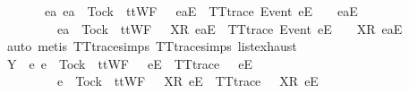 \begin{isabellebody}
\ \ \ \ \ \ {\isasymsubseteq}\ {\isacharbraceleft}ea{\isachardot}\ ea\ {\isasymnoteq}\ Tock\ {\isasymand}\ ttWF\ {\isacharparenleft}{\isasymsigma}{\isacharprime}\ {\isacharat}\ {\isacharbrackleft}{\isacharbrackleft}ea{\isacharbrackright}\isactrlsub E{\isacharbrackright}{\isacharparenright}\ {\isasymand}\ TT{}{\isacharunderscore}trace\ {\isacharparenleft}{\isacharbrackleft}Event\ e{\isacharbrackright}\isactrlsub E\ {\isacharhash}\ {\isasymsigma}{\isacharprime}\ {\isacharat}\ {\isacharbrackleft}{\isacharbrackleft}ea{\isacharbrackright}\isactrlsub E{\isacharbrackright}{\isacharparenright}\isanewline
\ \ \ \ \ \ \ \ {\isasymor}\ ea\ {\isacharequal}\ Tock\ {\isasymand}\ ttWF\ {\isacharparenleft}{\isasymsigma}{\isacharprime}\ {\isacharat}\ {\isacharbrackleft}{\isacharbrackleft}X{\isacharbrackright}\isactrlsub R{\isacharcomma}\ {\isacharbrackleft}ea{\isacharbrackright}\isactrlsub E{\isacharbrackright}{\isacharparenright}\ {\isasymand}\ TT{}{\isacharunderscore}trace\ {\isacharparenleft}{\isacharbrackleft}Event\ e{\isacharbrackright}\isactrlsub E\ {\isacharhash}\ {\isasymsigma}{\isacharprime}\ {\isacharat}\ {\isacharbrackleft}{\isacharbrackleft}X{\isacharbrackright}\isactrlsub R{\isacharcomma}\ {\isacharbrackleft}ea{\isacharbrackright}\isactrlsub E{\isacharbrackright}{\isacharparenright}{\isacharbraceright}{\isachardoublequoteclose}\isanewline
\ \ \ \ \ \ \isamarkupfalse%
\ {\isacharparenleft}auto{\isacharcomma}\ {\isacharparenleft}metis\ TT{}{\isacharunderscore}trace{\isachardot}simps{\isacharparenleft}{}{\isacharparenright}\ TT{}{\isacharunderscore}trace{\isachardot}simps{\isacharparenleft}{}{\isacharparenright}\ list{\isachardot}exhaust{\isacharparenright}{\isacharplus}{\isacharparenright}\isanewline
\ \ \ \ \isamarkupfalse%
\ \isamarkupfalse%
\ {\isachardoublequoteopen}Y\ {\isasyminter}\ {\isacharbraceleft}e{\isachardot}\ e\ {\isasymnoteq}\ Tock\ {\isasymand}\ ttWF\ {\isacharparenleft}{\isasymsigma}{\isacharprime}\ {\isacharat}\ {\isacharbrackleft}{\isacharbrackleft}e{\isacharbrackright}\isactrlsub E{\isacharbrackright}{\isacharparenright}\ {\isasymand}\ TT{}{\isacharunderscore}trace\ {\isacharparenleft}{\isasymsigma}{\isacharprime}\ {\isacharat}\ {\isacharbrackleft}{\isacharbrackleft}e{\isacharbrackright}\isactrlsub E{\isacharbrackright}{\isacharparenright}\isanewline
\ \ \ \ \ \ \ \ {\isasymor}\ e\ {\isacharequal}\ Tock\ {\isasymand}\ ttWF\ {\isacharparenleft}{\isasymsigma}{\isacharprime}\ {\isacharat}\ {\isacharbrackleft}{\isacharbrackleft}X{\isacharbrackright}\isactrlsub R{\isacharcomma}\ {\isacharbrackleft}e{\isacharbrackright}\isactrlsub E{\isacharbrackright}{\isacharparenright}\ {\isasymand}\ TT{}{\isacharunderscore}trace\ {\isacharparenleft}{\isasymsigma}{\isacharprime}\ {\isacharat}\ {\isacharbrackleft}{\isacharbrackleft}X{\isacharbrackright}\isactrlsub R{\isacharcomma}\ {\isacharbrackleft}e{\isacharbrackright}\isactrlsub E{\isacharbrackright}{\isacharparenright}{\isacharbraceright}\isanewline

\end{isabellebody}
